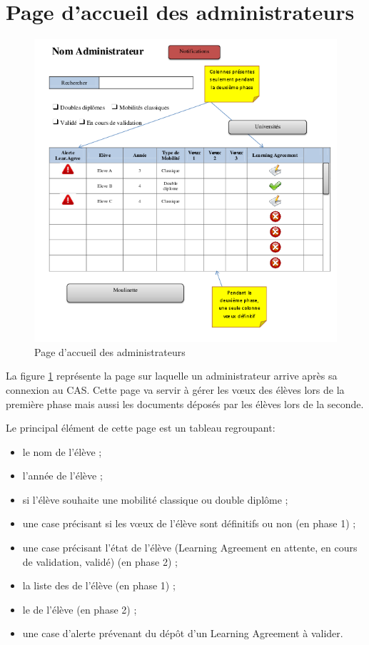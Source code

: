 \section{Page d'accueil des administrateurs}
\label{sec::home_admin}

\begin{figure}[H]
	\includegraphics[scale=0.7]{Admin/HomeAd.png}
	\caption{Page d'accueil des administrateurs}
	\label{fig::hpa1}
\end{figure}

La figure \ref{fig::hpa1} représente la page sur laquelle un administrateur arrive après sa connexion au CAS. Cette page va servir à gérer les vœux des élèves lors de la première phase mais aussi les documents déposés par les élèves lors de la seconde.

Le principal élément de cette page est un tableau regroupant:
\begin{itemize}
 	\item le nom de l'élève ;
 	\item l'année de l'élève ;
 	\item si l'élève souhaite une mobilité classique ou double diplôme ;
 	\item une case précisant si les vœux de l'élève sont définitifs ou non (en phase 1) ;
 	\item une case précisant l'état de l'élève (Learning Agreement en attente, en cours de validation, validé) (en phase 2) ;
 	\item la liste des \voe de l'élève (en phase 1) ;
 	\item le \voe de l'élève (en phase 2) ;
 	\item une case d'alerte prévenant du dépôt d'un Learning Agreement à valider.
 \end{itemize}
 
